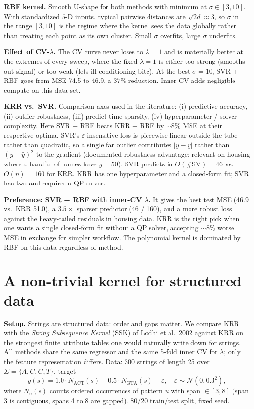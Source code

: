 \documentclass[10pt, a4paper]{article}
\begin{document}
\textbf{RBF kernel.} Smooth U-shape for both methods with minimum at $\sigma \in [3, 10]$. With standardized 5-D inputs, typical pairwise distances are $\sqrt{2d} \approx 3$, so $\sigma$ in the range $[3, 10]$ is the regime where the kernel sees the data globally rather than treating each point as its own cluster. Small $\sigma$ overfits, large $\sigma$ underfits.

\textbf{Effect of CV-$\lambda$.} The CV curve never loses to $\lambda = 1$ and is materially better at the extremes of every sweep, where the fixed $\lambda = 1$ is either too strong (smooths out signal) or too weak (lets ill-conditioning bite). At the best $\sigma = 10$, SVR + RBF goes from MSE 74.5 to 46.9, a $37\%$ reduction. Inner CV adds negligible compute on this data set.

\textbf{KRR vs.\ SVR.} Comparison axes used in the literature: (i) predictive accuracy, (ii) outlier robustness, (iii) predict-time sparsity, (iv) hyperparameter / solver complexity. Here SVR + RBF beats KRR + RBF by $\sim 8\%$ MSE at their respective optima. SVR's $\varepsilon$-insensitive loss is piecewise-linear outside the tube rather than quadratic, so a single far outlier contributes $|y-\hat y|$ rather than $(y-\hat y)^2$ to the gradient (documented robustness advantage; relevant on housing where a handful of homes have $y = 50$). SVR predicts in $O(\#\text{SV}) = 46$ vs.\ $O(n) = 160$ for KRR. KRR has one hyperparameter and a closed-form fit; SVR has two and requires a QP solver.

\textbf{Preference: SVR + RBF with inner-CV $\lambda$.} It gives the best test MSE (46.9 vs.\ KRR 51.0), a $3.5\times$ sparser predictor (46 / 160), and a more robust loss against the heavy-tailed residuals in housing data. KRR is the right pick when one wants a single closed-form fit without a QP solver, accepting $\sim 8\%$ worse MSE in exchange for simpler workflow. The polynomial kernel is dominated by RBF on this data regardless of method.

\clearpage

\section{A non-trivial kernel for structured data}

\textbf{Setup.} Strings are structured data: order and gaps matter. We compare KRR with the \emph{String Subsequence Kernel} (SSK) of Lodhi et al.\ 2002 against KRR on the strongest finite attribute tables one would naturally write down for strings. All methods share the same regressor and the same 5-fold inner CV for $\lambda$; only the feature representation differs. Data: 300 strings of length 25 over $\Sigma = \{A, C, G, T\}$, target
$$
y(s) = 1.0 \cdot N_{\text{ACT}}(s) - 0.5 \cdot N_{\text{GTA}}(s) + \varepsilon, \quad \varepsilon \sim \mathcal N(0, 0.3^2),
$$
where $N_u(s)$ counts ordered occurrences of pattern $u$ with span $\in [3, 8]$ (span 3 is contiguous, spans 4 to 8 are gapped). 80/20 train/test split, fixed seed.
\end{document}
